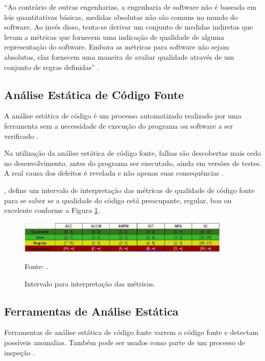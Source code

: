 \begin{citacao}
“Ao contrário de outras engenharias, a engenharia de software não é baseada em leis quantitativas básicas, medidas absolutas não são comuns no mundo do software. Ao invés disso, tenta-se derivar um conjunto de medidas indiretas que levam a métricas que fornecem uma indicação de qualidade de alguma representação do software. Embora as métricas para software não sejam absolutas, elas fornecem uma maneira de avaliar qualidade através de um conjunto de regras definidas” \cite[pág.~5]{bueno2011}.
\end{citacao}

\subsection{Análise Estática de Código Fonte}

A análise estática de código é um processo automatizado realizado por uma ferramenta sem a necessidade de execução do programa ou software a ser verificado \cite[pág.~64]{chess2007}.

Na utilização da análise estática de código fonte, falhas são descobertas mais cedo no desenvolvimento, antes do programa ser executado, ainda em versões de testes. A real causa dos defeitos é revelada e não apenas suas consequências \cite[pág.~19]{melo2011}.

, define um intervalo de interpretação das métricas de qualidade de código fonte para se saber se a qualidade do código está preocupante, regular, boa ou excelente conforme a Figura \ref{intervalosMetricas}.

\begin{figure}[H]
\centering
\includegraphics[width=0.9\textwidth]{figuras/intervalosMetricas}
\caption{Intervalo para interpretação das métricas.}{Fonte: .} 
\label{intervalosMetricas}
\end{figure}

\subsection{Ferramentas de Análise Estática}

Ferramentas de análise estática de código fonte varrem o código fonte e detectam possíveis anomalias. Também pode ser usados como parte de um processo de inspeção \cite[pág.~345]{sommerville}.

